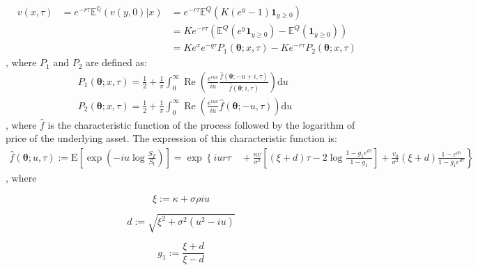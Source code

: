 \documentclass[12,twoside]{mammeTFM}
\theoremstyle{definition}
\theoremstyle{remark}
\newcommand{\E}{\ensuremath{\mathbb{E}}}
\newcommand{\Q}{\ensuremath{\mathbb{Q}}}
\begin{document}
\begin{align} 
\label{eq:option_valuation_expectation}
& v(x, \tau) & = e^{-r \tau}\E^{\Q}(v(y, 0)|x) & = e^{-r \tau} \E^{Q}(K(e^y - 1)\boldsymbol{1}_{y \geq 0}) \\  
\label{eq:option_valuation_useless}
&  &  & = Ke^{-r \tau}(\E^{Q}(e^y \boldsymbol{1}_{y \geq 0}) - \E^{Q}(\boldsymbol{1}_{y \geq 0})) \\
\label{eq:option_valuation_final_form}
&  &  & = K e^x e^{-q \tau} P_1(\boldsymbol{\theta}; x, \tau) - K e^{-r \tau} P_2(\boldsymbol{\theta}; x, \tau)
\end{align}
, where $P_1$ and $P_2$ are defined as:
\begin{align}
&P_{1}(\boldsymbol{\theta} ; x, \tau)=\frac{1}{2}+\frac{1}{\pi} \int_{0}^{\infty} \operatorname{Re}\left(\frac{e^{i u x}}{i u} \frac{\hat{f}(\boldsymbol{\theta} ; -u+i, \tau)}{\hat{f}(\boldsymbol{\theta} ;i, \tau)}\right) \mathrm{d} u\\
&P_{2}(\boldsymbol{\theta} ; x, \tau)=\frac{1}{2}+\frac{1}{\pi} \int_{0}^{\infty} \operatorname{Re}\left(\frac{e^{iux}}{i u} \hat{f}(\boldsymbol{\theta} ; -u, \tau)\right) \mathrm{d} u
\end{align}
, where $\hat{f}$ is the characteristic function of the process followed by the logarithm of price of the underlying asset. The expression of this characteristic function is:
\begin{equation} \label{eq:char_heston}
\begin{aligned}
\hat{f}(\boldsymbol{\theta} ; u, \tau):=\mathrm{E}\left[\exp \left(-i u \log \frac{S_{T}}{S_{t}}\right)\right]=\exp \left\{i u r \tau\right.
\left.\quad+\frac{\kappa \bar{v}}{\sigma^{2}}\left[(\xi+d) \tau-2 \log \frac{1-g_{1} e^{d \tau}}{1-g_{1}}\right]+\frac{v_{0}}{\sigma^{2}}(\xi+d) \frac{1-e^{d \tau}}{1-g_{1} e^{d \tau}}\right\}
\end{aligned}
\end{equation}
, where

\noindent\begin{minipage}{.3\linewidth}
\begin{equation}
\xi:=\kappa + \sigma \rho i u
\end{equation}
\end{minipage}
\noindent\begin{minipage}{.4\linewidth}
\begin{equation} \label{eq:char_d}
d:=\sqrt{\xi^{2}+\sigma^{2}\left(u^{2} - i u\right)}
\end{equation}
\end{minipage}
\noindent\begin{minipage}{.3\linewidth}
\begin{equation}
g_{1}:=\frac{\xi+d}{\xi-d}
\end{equation}
\end{minipage}
\end{document}
